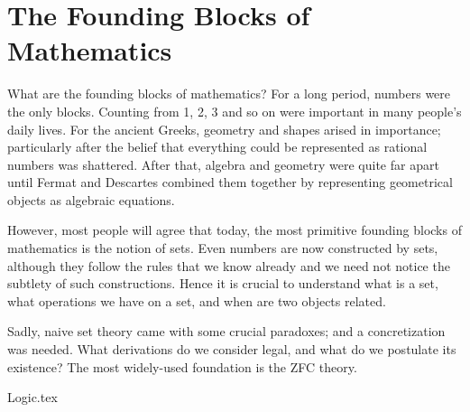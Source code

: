 \part[Blocks]{The Founding Blocks of Mathematics}

What are the founding blocks of mathematics?
For a long period, numbers were the only blocks.
Counting from 1, 2, 3 and so on were important
in many people's daily lives.
For the ancient Greeks,
geometry and shapes arised in importance;
particularly after
the belief that everything could be represented as rational numbers
was shattered.
After that, algebra and geometry were quite far apart
until Fermat and Descartes combined them together
by representing geometrical objects as algebraic equations.

However, most people will agree that
today, the most primitive founding blocks of mathematics
is the notion of sets.
Even numbers are now constructed by sets,
although they follow the rules that we know already
and we need not notice the subtlety of such constructions.
Hence it is crucial to understand
what is a set,
what operations we have on a set,
and when are two objects related.

Sadly, naive set theory came with some crucial paradoxes;
and a concretization was needed.
What derivations do we consider legal,
and what do we postulate its existence?
The most widely-used foundation is the ZFC theory.

{Logic.tex}